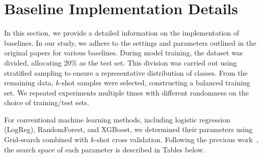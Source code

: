 \documentclass{article}
\theoremstyle{plain}
\theoremstyle{definition}
\theoremstyle{remark}
\begin{document}


\newpage


\section{Baseline Implementation Details}
\label{sec:baselines}
In this section, we provide a detailed information on the implementation of baselines. 
In our study, we adhere to the settings and parameters outlined in the original papers for various baselines. During model training, the dataset was divided, allocating 20\% as the test set. This division was carried out using stratified sampling to ensure a representative distribution of classes. From the remaining data, $k$-shot samples were selected, constructing a balanced training set. We repeated experiments multiple times with different randomness on the choice of training/test sets. 

For conventional machine learning methods, including logistic regression (LogReg), RandomForest, and XGBoost, we determined their parameters using Grid-search combined with $k$-shot cross validation. Following the previous work~\cite{hegselmann2023tabllm}, the search space of each parameter is described in Tables below.
\end{document}
